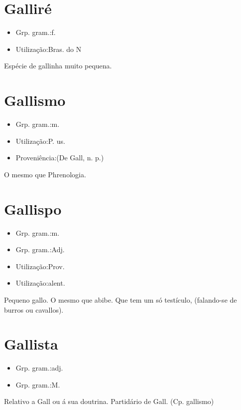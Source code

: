 \section{Galliré}
\begin{itemize}
\item {Grp. gram.:f.}
\end{itemize}
\begin{itemize}
\item {Utilização:Bras. do N}
\end{itemize}
Espécie de gallinha muito pequena.
\section{Gallismo}
\begin{itemize}
\item {Grp. gram.:m.}
\end{itemize}
\begin{itemize}
\item {Utilização:P. us.}
\end{itemize}
\begin{itemize}
\item {Proveniência:(De \textunderscore Gall\textunderscore , n. p.)}
\end{itemize}
O mesmo que \textunderscore Phrenologia\textunderscore .
\section{Gallispo}
\begin{itemize}
\item {Grp. gram.:m.}
\end{itemize}
\begin{itemize}
\item {Grp. gram.:Adj.}
\end{itemize}
\begin{itemize}
\item {Utilização:Prov.}
\end{itemize}
\begin{itemize}
\item {Utilização:alent.}
\end{itemize}
Pequeno gallo.
O mesmo que \textunderscore abibe\textunderscore .
Que tem um só testículo, (falando-se de burros ou cavallos).
\section{Gallista}
\begin{itemize}
\item {Grp. gram.:adj.}
\end{itemize}
\begin{itemize}
\item {Grp. gram.:M.}
\end{itemize}
Relativo a Gall ou á sua doutrina.
Partidário de Gall.
(Cp. \textunderscore gallismo\textunderscore )
